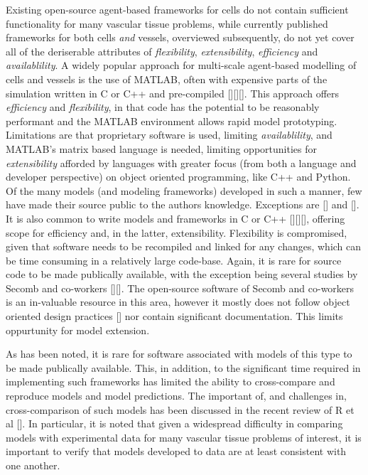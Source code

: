 \documentclass[superscriptaddress, a4paper]{article}
\begin{document}
Existing open-source agent-based frameworks for cells do not contain sufficient functionality for many vascular tissue problems, while currently published frameworks for both cells \emph{and} vessels, overviewed subsequently, do not yet cover all of the deriserable attributes of \emph{flexibility}, \emph{extensibility},  \emph{efficiency} and \emph{availablility}. A widely popular approach for multi-scale agent-based modelling of cells and vessels is the use of MATLAB, often with expensive parts of the simulation written in C or C++ and pre-compiled [][][]. This approach offers \emph{efficiency} and \emph{flexibility}, in that code has the potential to be reasonably performant and the MATLAB environment allows rapid model prototyping. Limitations are that proprietary software is used, limiting \emph{availablility}, and MATLAB's matrix based language is needed, limiting opportunities for \emph{extensibility} afforded by languages with greater focus (from both a language and developer perspective) on object oriented programming, like C++ and Python. Of the many models (and modeling frameworks) developed in such a manner, few have made their source public to the authors knowledge. Exceptions are [] and []. It is also common to write models and frameworks in C or C++ [][][], offering scope for efficiency and, in the latter, extensibility. Flexibility is compromised, given that software needs to be recompiled and linked for any changes, which can be time consuming in a relatively large code-base. Again, it is rare for source code to be made publically available, with the exception being several studies by Secomb and co-workers [][]. The open-source software of Secomb and co-workers is an in-valuable resource in this area, however it mostly does not follow object oriented design practices [] nor contain significant documentation. This limits oppurtunity for model extension. 

As has been noted, it is rare for software associated with models of this type to be made publically available. This, in addition, to the significant time required in implementing such frameworks has limited the ability to cross-compare and reproduce models and model predictions. The important of, and challenges in, cross-comparison of such models has been discussed in the recent review of R et al []. In particular, it is noted that given a widespread difficulty in comparing models with experimental data for many vascular tissue problems of interest, it is important to verify that models developed to data are at least consistent with one another.
\end{document}

